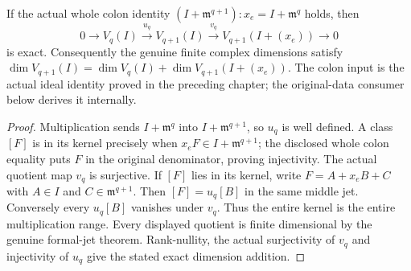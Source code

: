 \begin{theorem}
\label{hir:actual-exceptional-jet-exact-sequence-rank}
\leanok
If the actual whole colon identity
$(I+\mathfrak m^{q+1}):x_e=I+\mathfrak m^q$ holds, then
\[
0\longrightarrow V_q(I)\xrightarrow{u_q}V_{q+1}(I)
\xrightarrow{v_q}V_{q+1}(I+(x_e))\longrightarrow0
\]
is exact. Consequently the genuine finite complex dimensions satisfy
$\dim V_{q+1}(I)=\dim V_q(I)+\dim V_{q+1}(I+(x_e))$.
The colon input is the actual ideal identity proved in the preceding
chapter; the original-data consumer below derives it internally.
\end{theorem}
\begin{proof}
Multiplication sends $I+\mathfrak m^q$ into
$I+\mathfrak m^{q+1}$, so $u_q$ is well defined. A class $[F]$ is in
its kernel precisely when $x_eF\in I+\mathfrak m^{q+1}$; the disclosed
whole colon equality puts $F$ in the original denominator, proving
injectivity. The actual quotient map $v_q$ is surjective. If $[F]$
lies in its kernel, write $F=A+x_eB+C$ with $A\in I$ and
$C\in\mathfrak m^{q+1}$. Then $[F]=u_q[B]$ in the same middle jet.
Conversely every $u_q[B]$ vanishes under $v_q$. Thus the entire kernel
is the entire multiplication range. Every displayed quotient is
finite dimensional by the genuine formal-jet theorem. Rank-nullity,
the actual surjectivity of $v_q$ and injectivity of $u_q$ give the
stated exact dimension addition.
\end{proof}

